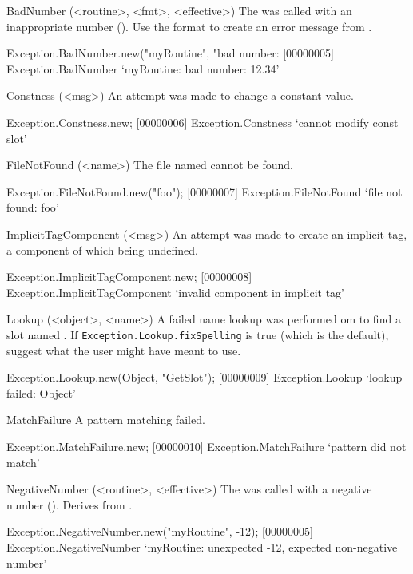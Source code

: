 \begin{urbiscriptapi}
\item[BadNumber](<routine>, <fmt>, <effective>)
  The  was called with an inappropriate number
  ().  Use the format  to create an error
  message from .
\begin{urbiscript}
Exception.BadNumber.new("myRoutine", "bad number: %
[00000005] Exception.BadNumber `myRoutine: bad number: 12.34'
\end{urbiscript}

\item[Constness](<msg>)
  An attempt was made to change a constant value.
\begin{urbiscript}
Exception.Constness.new;
[00000006] Exception.Constness `cannot modify const slot'
\end{urbiscript}

\item[FileNotFound](<name>)
  The file named  cannot be found.
\begin{urbiscript}
Exception.FileNotFound.new("foo");
[00000007] Exception.FileNotFound `file not found: foo'
\end{urbiscript}

\item[ImplicitTagComponent](<msg>)
  An attempt was made to create an implicit tag, a component of which
  being undefined.
\begin{urbiscript}
Exception.ImplicitTagComponent.new;
[00000008] Exception.ImplicitTagComponent `invalid component in implicit tag'
\end{urbiscript}

\item[Lookup](<object>, <name>)
  A failed name lookup was performed om  to find a slot
  named .  If \lstinline|Exception.Lookup.fixSpelling| is
  true (which is the default), suggest what the user might have meant
  to use.
\begin{urbiscript}
Exception.Lookup.new(Object, "GetSlot");
[00000009] Exception.Lookup `lookup failed: Object'
\end{urbiscript}

\item[MatchFailure]
  A pattern matching failed.
\begin{urbiscript}
Exception.MatchFailure.new;
[00000010] Exception.MatchFailure `pattern did not match'
\end{urbiscript}

\item[NegativeNumber](<routine>, <effective>)
  The  was called with a negative number
  ().  Derives from .
\begin{urbiscript}
Exception.NegativeNumber.new("myRoutine", -12);
[00000005] Exception.NegativeNumber `myRoutine: unexpected -12, expected non-negative number'
\end{urbiscript}


\end{urbiscriptapi}
